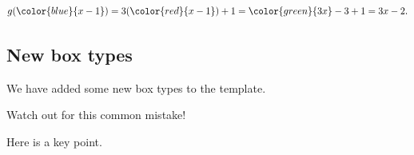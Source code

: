 \documentclass[
]{article}
\numberwithin{equation}{section}
\numberwithin{figure}{section}
\theoremstyle{break}
\theoremstyle{definition}
\theoremstyle{definition}
\theoremstyle{definition}
\theoremstyle{definition}
\theoremstyle{remark}
\begin{document}
\[
g(\color{blue}{x-1}) = 3(\color{red}{x-1}) + 1 = \color{green}{3x} - 3 + 1 = 3x-2.
\]

\hypertarget{new-box-types}{%
\subsection{New box types}\label{new-box-types}}

We have added some new box types to the template.

Watch out for this common mistake!

Here is a key point.

  
\end{document}
